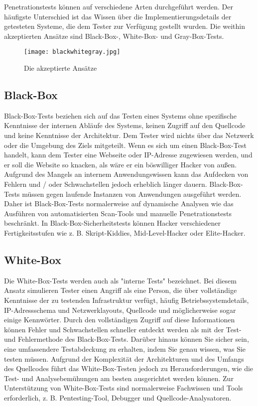 Penetrationstests können auf verschiedene Arten durchgeführt werden. Der häufigste Unterschied ist das Wissen über die Implementierungsdetails der getesteten Systeme, die dem Tester zur Verfügung gestellt wurden. Die weithin akzeptierten Ansätze sind Black-Box-, White-Box- und Gray-Box-Tests.

\begin{figure}
	\centering
	\texttt{[image: blackwhitegray.jpg]}
	\caption{Die akzeptierte Ansätze\cite{bwgtesting16}}
\end{figure}

\subsection{Black-Box}

Black-Box-Tests beziehen sich auf das Testen eines Systems ohne spezifische Kenntnisse der internen Abläufe des Systems, keinen Zugriff auf den Quellcode und keine Kenntnisse der Architektur\cite{bwgwebtesting07}. Dem Tester wird nichts über das Netzwerk oder die Umgebung des Ziels mitgeteilt\cite{tiller2004ethical}. Wenn es sich um einen Black-Box-Test handelt, kann dem Tester eine Webseite oder IP-Adresse zugewiesen werden, und er soll die Website so knacken, als wäre er ein böswilliger Hacker von außen\cite{whitaker2005penetration}. Aufgrund des Mangels an internem Anwendungswissen kann das Aufdecken von Fehlern und / oder Schwachstellen jedoch erheblich länger dauern. Black-Box-Tests müssen gegen laufende Instanzen von Anwendungen ausgeführt werden. Daher ist Black-Box-Tests normalerweise auf dynamische Analysen wie das Ausführen von automatisierten Scan-Tools und manuelle Penetrationstests beschränkt\cite{bwgwebtesting07}. In Black-Box-Sicherheitstests können Hacker verschiedener Fertigkeitsstufen wie z. B. Skript-Kiddies, Mid-Level-Hacker oder Elite-Hacker\cite{bwgprole18}.

\subsection{White-Box}

Die White-Box-Tests werden auch als "interne Tests" bezeichnet. Bei diesem Ansatz simulieren Tester einen Angriff als eine Person, die über vollständige Kenntnisse der zu testenden Infrastruktur verfügt, häufig Betriebssystemdetails, IP-Adressschema und Netzwerklayouts, Quellcode und möglicherweise sogar einige Kennwörter\cite{ali2011pt}. Durch den vollständigen Zugriff auf diese Informationen können Fehler und Schwachstellen schneller entdeckt werden als mit der Test- und Fehlermethode des Black-Box-Tests. Darüber hinaus können Sie sicher sein, eine umfassendere Testabdeckung zu erhalten, indem Sie genau wissen, was Sie testen müssen. Aufgrund der Komplexität der Architekturen und des Umfangs des Quellcodes führt das White-Box-Testen jedoch zu Herausforderungen, wie die Test- und Analysebemühungen am besten ausgerichtet werden können. Zur Unterstützung von White-Box-Tests sind normalerweise Fachwissen und Tools erforderlich, z. B. Pentesting-Tool, Debugger und Quellcode-Analysatoren\cite{bwgwebtesting07}.

